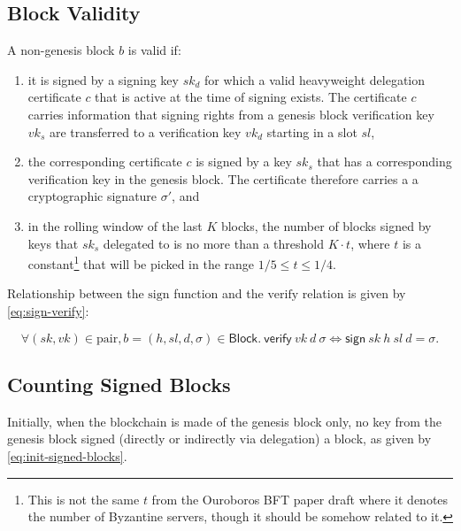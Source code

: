 \documentclass[11pt,a4paper]{article}
\newcommand{\var}[1]{\mathit{#1}}
\newcommand{\fun}[1]{\mathsf{#1}}
\newcommand{\type}[1]{\mathsf{#1}}
\newcommand{\Block}{\type{Block}}
\newcommand{\signname}{sign}
\newcommand{\verifyname}{verify}
\newcommand{\keypairname}{pair}
\newcommand{\sign}[4]{\fun{\signname}\ #1 ~ #2 ~ #3 ~ #4}
\newcommand{\verify}[3]{\fun{\verifyname} ~ #1 ~ #2 ~ #3}
\begin{document}
\subsection{Block Validity}
\label{sec:block-valid}

A non-genesis block $\var{b}$ is valid if:
%
\begin{enumerate}
\item it is signed by a signing key $sk_d$ for which a valid heavyweight
  delegation certificate $c$ that is active at the time of signing exists.
  The certificate $c$ carries information that signing rights from a genesis
  block verification key $vk_s$ are transferred to a verification key $vk_d$
  starting in a slot $sl$,
\item the corresponding certificate $c$ is signed by a key $sk_s$ that has a
  corresponding verification key in the genesis block.
  The certificate therefore carries a a cryptographic signature $\sigma'$,
  and
\item in the rolling window of the last $K$ blocks, the number of blocks
  signed by keys that $sk_s$ delegated to is no more than a threshold
  $K \cdot t$, where $t$ is a constant\footnote{This is not the same $t$ from
    the Ouroboros BFT paper draft where it denotes the number of Byzantine
    servers, though it should be somehow related to it.}  that will be picked
  in the range $1/5 \leq t \leq 1/4$.
\end{enumerate}

Relationship between the $\text{\signname}$ function and the
$\text{\verifyname}$ relation is given by \eqref{eq:sign-verify}:

\begin{equation}
  \label{eq:sign-verify}
  \forall (sk, vk) \in \text{\keypairname}, b = (h, sl, d, \sigma) \in \Block.\
  \verify{vk}{d}{\sigma} \iff \sign{sk}{h}{sl}{d} = \sigma.
\end{equation}


\subsection{Counting Signed Blocks}
\label{sec:counting-signed-blocks}

Initially, when the blockchain is made of the genesis block only, no key from
the genesis block signed (directly or indirectly via delegation) a block, as
given by \eqref{eq:init-signed-blocks}.
\end{document}
